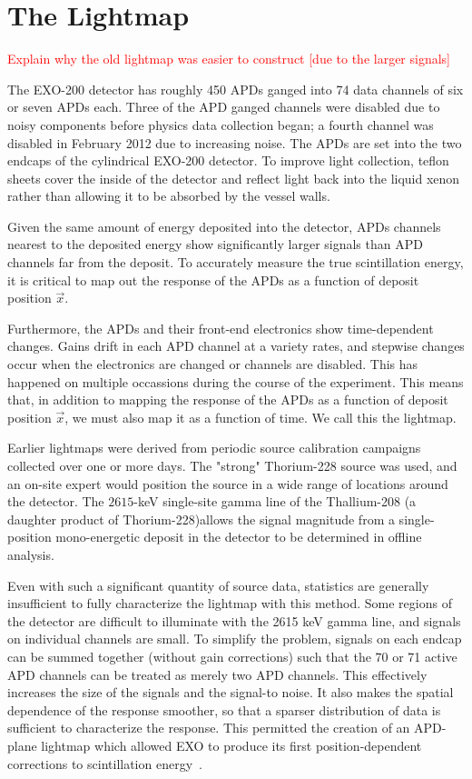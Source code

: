 \renewcommand{\thechapter}{6}
\chapter{The Lightmap}
\label{ch:Lightmap}

\textcolor{red}{Explain why the old lightmap was easier to construct [due to the larger signals]}

The EXO-200 detector has roughly 450 APDs ganged into 74 data channels of six or seven APDs each. Three of the APD ganged channels were disabled due to noisy components before physics data collection began; a fourth channel was disabled in February 2012 due to increasing noise.  The APDs are set into the two endcaps of the cylindrical EXO-200 detector.  To improve light collection, teflon sheets cover the inside of the detector and reflect light back into the liquid xenon rather than allowing it to be absorbed by the vessel walls.

Given the same amount of energy deposited into the detector, APDs channels nearest to the deposited energy show significantly larger signals than APD channels far from the deposit.   To accurately measure the true scintillation energy, it is critical to map out the response of the APDs as a function of deposit position $\vec{x}$.

Furthermore, the APDs and their front-end electronics show time-dependent changes. Gains drift in each APD channel at a variety rates, and stepwise changes occur when the electronics are changed or channels are disabled. This has happened on multiple occassions during the course of the experiment.  This means that, in addition to mapping the response of the APDs as a function of deposit position $\vec{x}$, we must also map it as a function of  time. We call this the lightmap.

Earlier lightmaps were derived from periodic source calibration campaigns collected over one or more days. The "strong" Thorium-228 source was used, and an on-site expert would  position the source in a wide range of locations around the detector.  The $2615$-keV single-site gamma line of the Thallium-208 (a daughter product of Thorium-228)allows the signal magnitude from a single-position mono-energetic deposit in the detector to be determined in offline analysis.

Even with such a significant quantity of source data, statistics are generally insufficient to fully characterize the lightmap with this method.  Some regions of the detector are difficult to illuminate with the 2615 keV gamma line, and signals on individual channels are small.  To simplify the problem, signals on each endcap can be summed together (without gain corrections) such that the 70 or 71 active APD channels can be treated as merely two APD channels.  This effectively increases the size of the signals and the signal-to noise. It also makes the spatial dependence of the response smoother, so that a sparser distribution of data is sufficient to characterize the response.  This permitted the creation of an APD-plane lightmap which allowed EXO to produce its first position-dependent corrections to scintillation energy~\cite{ThesisSteve}.

